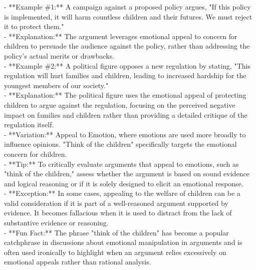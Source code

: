 \documentclass[a4paper,12pt,single,pdftex]{scrartcl}
\begin{document}
    
      - **Example \#1:** A campaign against a proposed policy argues, "If this policy is implemented, it will harm countless children and their futures. We must reject it to protect them."
    \\

    
      - **Explanation:** The argument leverages emotional appeal to concern for children to persuade the audience against the policy, rather than addressing the policy’s actual merits or drawbacks.
    \\

    
      - **Example \#2:** A political figure opposes a new regulation by stating, "This regulation will hurt families and children, leading to increased hardship for the youngest members of our society."
    \\

    
      - **Explanation:** The political figure uses the emotional appeal of protecting children to argue against the regulation, focusing on the perceived negative impact on families and children rather than providing a detailed critique of the regulation itself.
    \\

    
      - **Variation:** Appeal to Emotion, where emotions are used more broadly to influence opinions. "Think of the children" specifically targets the emotional concern for children.
    \\

    
      - **Tip:** To critically evaluate arguments that appeal to emotions, such as "think of the children," assess whether the argument is based on sound evidence and logical reasoning or if it is solely designed to elicit an emotional response.
    \\

    
      - **Exception:** In some cases, appealing to the welfare of children can be a valid consideration if it is part of a well-reasoned argument supported by evidence. It becomes fallacious when it is used to distract from the lack of substantive evidence or reasoning.
    \\

    
      - **Fun Fact:** The phrase "think of the children" has become a popular catchphrase in discussions about emotional manipulation in arguments and is often used ironically to highlight when an argument relies excessively on emotional appeals rather than rational analysis.
    \\

  
\end{document}
